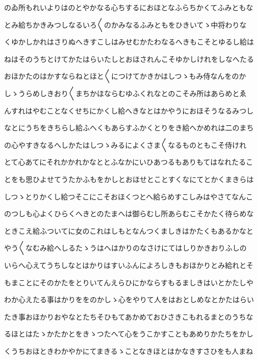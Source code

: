 \documentclass[a4paper,11pt,landscape]{ltjtarticle}
\begin{document}
\par\medskip
のゐ所もれいよりはのとやかなる心ちするにおほとなふらちかくてふみともな
\par\medskip
とみ給ちかきみつしなるいろ〱のかみなるふみともをひきいてゝ中将わりな
\par\medskip
くゆかしかれはさりぬへきすこしはみせむかたわなるへきもこそとゆるし給は
\par\medskip
ねはそのうちとけてかたはらいたしとおほされんこそゆかしけれをしなへたる
\par\medskip
おほかたのはかすならねとほと〱につけてかきかはしつゝもみ侍なんをのか
\par\medskip
しゝうらめしきおり〱まちかほならむゆふくれなとのこそみ所はあらめとゑ
\par\medskip
んすれはやむことなくせちにかくし給へきなとはかやうにおほそうなるみつし
\par\medskip
なとにうちをきちらし給ふへくもあらすふかくとりをき給へかめれは二のまち
\par\medskip
の心やすきなるへしかたはしつゝみるによくさま〱なるものともこそ侍けれ
\par\medskip
とて心あてにそれかかれかなととふなかにいひあつるもありもてはなれたるこ
\par\medskip
とをも思ひよせてうたかふもをかしとおほせとことすくなにてとかくまきらは
\par\medskip
しつゝとりかくし給つそこにこそおほくつとへ給らめすこしみはやさてなんこ
\par\medskip
のつしも心よくひらくへきとのたまへは御らむし所あらむこそかたく待らめな
\par\medskip
ときこえ給ふついてに女のこれはしもとなんつくましきはかたくもあるかなと
\par\medskip
やう〱なむみ給へしるたゝうはへはかりのなさけにてはしりかきおりふしの
\par\medskip
いらへ心えてうちしなとはかりはすいふんによろしきもおほかりとみ給れとそ
\par\medskip
もまことにそのかたをとりいてんえらひにかならすもるましきはいとかたしや
\par\medskip
わか心えたる事はかりををのかしゝ心をやりて人をはおとしめなとかたはらい
\par\medskip
たき事おほかりおやなとたちそひもてあかめておひさきこもれるまとのうちな
\par\medskip
るほとはたゝかたかとをきゝつたへて心をうこかすこともあめりかたちをかし
\par\medskip
くうちおほときわかやかにてまきるゝことなきほとはかなきすさひをも人まね
\par\medskip
\end{document}
